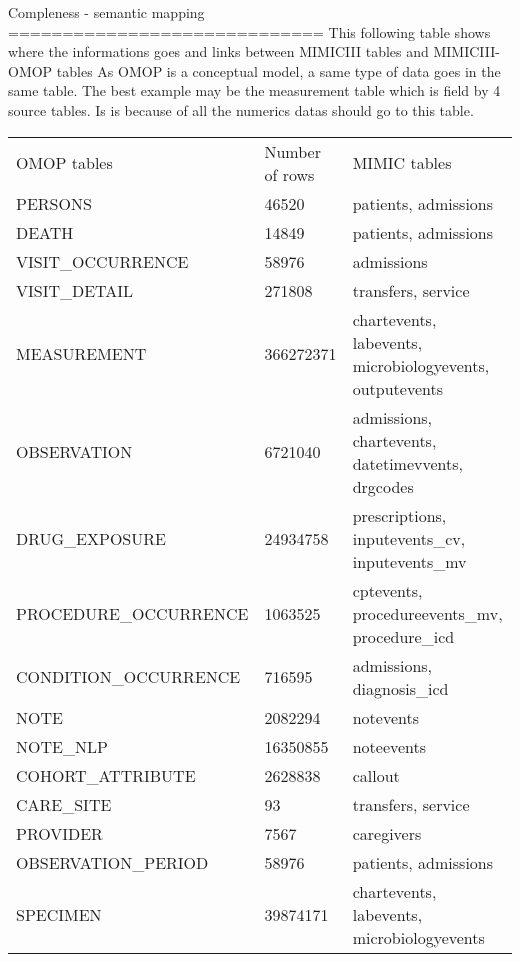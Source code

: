 Compleness - semantic mapping 
=============================
This following table shows where the informations goes and links between MIMICIII tables and MIMICIII-OMOP tables
As OMOP is a conceptual model, a same type of data goes in the same table. The best example may be the measurement table which is field by 4 source tables. Is is because of all the numerics datas should go to this table.

\begin{table}[]
\begin{tabular}{lll}
OMOP tables           & Number of rows & MIMIC tables                                             \\
PERSONS               & 46520          & patients, admissions                                     \\
DEATH                 & 14849          & patients, admissions                                     \\
VISIT\_OCCURRENCE     & 58976          & admissions                                               \\
VISIT\_DETAIL         & 271808         & transfers, service                                       \\
MEASUREMENT           & 366272371      & chartevents, labevents, microbiologyevents, outputevents \\
OBSERVATION           & 6721040        & admissions, chartevents, datetimevvents, drgcodes        \\
DRUG\_EXPOSURE        & 24934758       & prescriptions, inputevents\_cv, inputevents\_mv          \\
PROCEDURE\_OCCURRENCE & 1063525        & cptevents, procedureevents\_mv, procedure\_icd           \\
CONDITION\_OCCURRENCE & 716595         & admissions, diagnosis\_icd                               \\
NOTE                  & 2082294        & notevents                                                \\
NOTE\_NLP             & 16350855       & noteevents                                               \\
COHORT\_ATTRIBUTE     & 2628838        & callout                                                  \\
CARE\_SITE            & 93             & transfers, service                                       \\
PROVIDER              & 7567           & caregivers                                               \\
OBSERVATION\_PERIOD   & 58976          & patients, admissions                                     \\
SPECIMEN              & 39874171       & chartevents, labevents, microbiologyevents              
\end{tabular}
\end{table}

